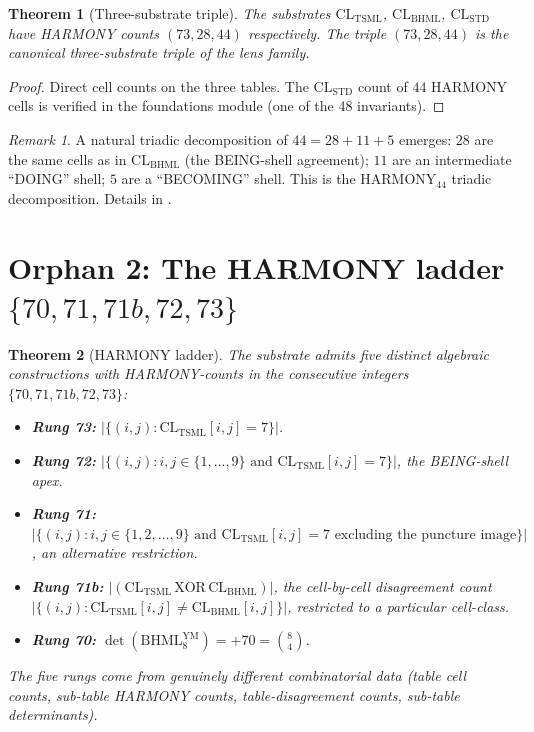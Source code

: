 \documentclass[11pt,reqno]{amsart}
\theoremstyle{plain}
\newtheorem{theorem}{Theorem}[section]
\theoremstyle{definition}
\theoremstyle{remark}
\newtheorem*{remark}{Remark}
\newcommand{\TSML}{\mathrm{TSML}}
\newcommand{\BHML}{\mathrm{BHML}}
\newcommand{\STD}{\mathrm{STD}}
\begin{document}
\begin{theorem}[Three-substrate triple]\label{thm:triple}
The substrates $\mathrm{CL}_\TSML$, $\mathrm{CL}_\BHML$,
$\mathrm{CL}_\STD$ have HARMONY counts $(73, 28, 44)$ respectively.
The triple $(73, 28, 44)$ is the canonical \emph{three-substrate
triple} of the lens family.
\end{theorem}

\begin{proof}
Direct cell counts on the three tables. The
$\mathrm{CL}_\STD$ count of $44$ HARMONY cells is verified in the
foundations module (one of the $48$ invariants).
\end{proof}

\begin{remark}
A natural triadic decomposition of $44 = 28 + 11 + 5$ emerges:
$28$ are the same cells as in $\mathrm{CL}_\BHML$ (the BEING-shell
agreement); $11$ are an intermediate ``DOING'' shell;
$5$ are a ``BECOMING'' shell. This is the
$\mathrm{HARMONY}_{44}$ triadic decomposition. Details in
\cite{LensCatalog}.
\end{remark}

\section{Orphan 2: The HARMONY ladder $\{70, 71, 71b, 72, 73\}$}
\label{sec:ladder}

\begin{theorem}[HARMONY ladder]\label{thm:ladder}
The substrate admits five distinct algebraic constructions with
HARMONY-counts in the consecutive integers $\{70, 71, 71b, 72, 73\}$:

\begin{itemize}
\item \textbf{Rung 73:} $|\{(i, j) : \mathrm{CL}_\TSML[i, j] = 7\}|$.
\item \textbf{Rung 72:} $|\{(i, j) : i, j \in \{1, \ldots, 9\} \text{ and } \mathrm{CL}_\TSML[i, j] = 7\}|$, the BEING-shell apex.
\item \textbf{Rung 71:} $|\{(i, j) : i, j \in \{1, 2, \ldots, 9\} \text{ and } \mathrm{CL}_\TSML[i, j] = 7 \text{ excluding the puncture image}\}|$, an alternative restriction.
\item \textbf{Rung 71b:} $|(\mathrm{CL}_\TSML \,\mathrm{XOR}\, \mathrm{CL}_\BHML)|$, the cell-by-cell disagreement count $|\{(i, j) : \mathrm{CL}_\TSML[i, j] \neq \mathrm{CL}_\BHML[i, j]\}|$, restricted to a particular cell-class.
\item \textbf{Rung 70:} $\det(\mathrm{BHML}_8^{\text{YM}}) = +70 = \binom{8}{4}$.
\end{itemize}
The five rungs come from genuinely different combinatorial data
(table cell counts, sub-table HARMONY counts, table-disagreement
counts, sub-table determinants).
\end{theorem}
\end{document}
